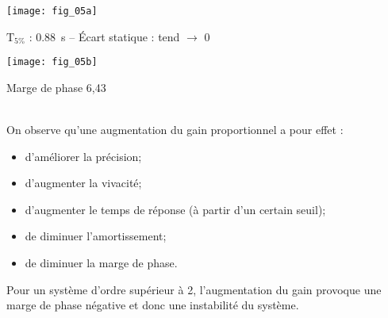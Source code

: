 \noindent
\begin{minipage}[c]{.46\linewidth}
\begin{center}
\texttt{[image: fig\_05a]}

$\text{T}_{5\%}$ : \SI{0,88}{s} -- Écart statique : tend $\to$ 0
\end{center}

\end{minipage} \hfill
\begin{minipage}[c]{.46\linewidth}
\begin{center}
\texttt{[image: fig\_05b]}

Marge de phase 6,43 \degres
\end{center}
\end{minipage} 

\begin{resultat}
~\\
On observe qu'une augmentation du gain proportionnel a pour effet :
\begin{itemize}
\item d'améliorer la précision;
\item d'augmenter la vivacité;
\item d'augmenter le temps de réponse (à partir d'un certain seuil);
\item de diminuer l'amortissement;
\item de diminuer la marge de phase.
\end{itemize}
Pour un système d'ordre supérieur à 2, l'augmentation du gain provoque une marge de phase négative et donc une instabilité du système.
\end{resultat}

